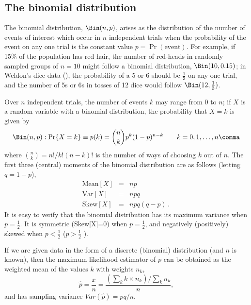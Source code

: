 \documentclass[11pt]{book}
\begin{document}



\subsection{The binomial distribution}\label{sec:binomial}
The binomial distribution, $\Bin(n, p)$, 
arises as the distribution of the
number of events of interest which occur in $n$ independent trials
when the probability of the event on any one trial is the constant
value $p = \Pr ( \textrm{event} )$.
For example, if 15\% of the population has red hair,
the number of red-heads in randomly sampled groups of $n=10$
might follow a binomial distribution, $\Bin(10, 0.15)$;
in Weldon's dice data (), the probability of
a 5 or 6 should be $\frac13$ on any one trial, and
the number of 5s or 6s in tosses of 12 dice would follow
$\Bin(12, \frac13)$.

Over $n$ independent trials, the number of events  $k$
may range from 0 to $n$; if $X$ is a random variable
with a binomial distribution, the probability that $X = k$ is given
by
\begin{equation}\label{eq:binom}
\Bin(n,p): \Pr \{ X = k \} \equiv p ( k )  =
{n \choose k} p^k (1-p)^{n-k}
  \quad\quad k = 0, 1, \dots, n
  \comma
\end{equation}
where ${n \choose k} = n! / k! (n - k)!$ is the number of ways
of choosing $k$ out of $n$.
The first three (central) moments of the binomial distribution are
as follows 
(letting $q = 1 - p$),
\begin{eqnarray*}
\textrm{Mean}[X] & = & n p  \\
\textrm{Var}[X] &  = & n p q \\
\textrm{Skew}[X] & = & n p q (q - p) 
\period
\end{eqnarray*}
It is easy to verify that
the binomial distribution has its maximum variance when $p = \frac12$.
It is symmetric (Skew[X]=0) when $p = \frac12$, and negatively (positively)
skewed when $p < \frac12$ ($p > \frac12$ ).

If we are given data in the form of a discrete (binomial) distribution
(and $n$ is known),
then the maximum likelihood estimator of $p$ can be obtained
as the weighted mean of the values $k$ with weights $n_k$,
\begin{equation*}%
\hat{p} = \frac{\bar{x}}{n} =
  \frac{(\sum_{k} k \times n_k ) / \sum_k n_k}{n}
  \comma
\end{equation*}
and has sampling variance $Var(\hat{p}) = pq/n$.
\end{document}
